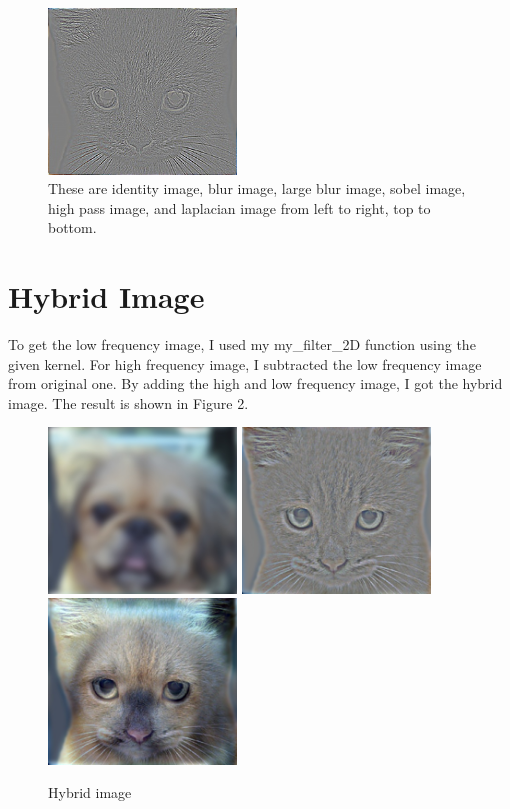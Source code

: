 \begin{figure}[h]
		\includegraphics[width=5cm]{../result/test/laplacian_image.jpg}
		\caption{These are identity image, blur image, large blur image, sobel image, high pass image, and laplacian image from left to right, top to bottom. }
	\end{figure}

\section*{Hybrid Image}

To get the low frequency image, I used my my\_filter\_2D function using the given kernel. For high frequency image, I subtracted the low frequency image from original one. By adding the high and low frequency image, I got the hybrid image. The result is shown in Figure 2. 

	\begin{figure}[h]
		\centering
		\includegraphics[width=5cm]{../result/low_frequencies.jpg}
		\includegraphics[width=5cm]{../result/high_frequencies.jpg}
		\includegraphics[width=5cm]{../result/hybrid_image.jpg}
		\caption{Hybrid image}
	\end{figure}



